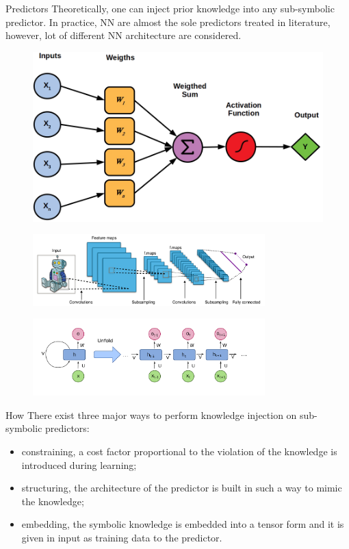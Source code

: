 \documentclass[presentation]{beamer}\mode<presentation>{\usetheme{AMSBolognaFC}}
\begin{document}
\begin{frame}[allowframebreaks]{Predictors}
    Theoretically, one can inject prior knowledge into any sub-symbolic predictor.
    In practice, NN are almost the sole predictors treated in literature, however, lot of different NN architecture are considered.
    \begin{figure}
        \centering
        \includegraphics[width=.6\linewidth]{figures/neuron.png}
    \end{figure}
    
    \framebreak
    
    \begin{figure}
        \centering
        \includegraphics[width=0.8\textwidth]{figures/cnn-architecture}
    \end{figure}
    \begin{figure}
        \centering
        \includegraphics[width=0.8\textwidth]{figures/rnn-architecture}
    \end{figure}
\end{frame}


\begin{frame}[c]{How}
    There exist three major ways to perform knowledge injection on sub-symbolic predictors:
    \begin{itemize}
        \item \alert{constraining}, a cost factor proportional to the violation of the knowledge is introduced during learning;
        \item \alert{structuring}, the architecture of the predictor is built in such a way to mimic the knowledge;
        \item \alert{embedding}, the symbolic knowledge is embedded into a tensor form and it is given in input as training data to the predictor.
    \end{itemize} 
\end{frame}
\end{document}

